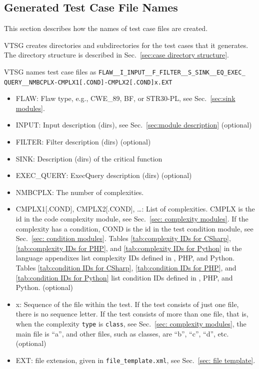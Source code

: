 \subsection{Generated Test Case File Names}

This section describes how the names of test case files are created.

VTSG creates directories and subdirectories for the test cases that it generates.
The directory structure is described in
Sec.~\ref{sec:case directory structure}.

\label{sec:case file name}

VTSG names test case files as
\verb|FLAW__I_INPUT__F_FILTER__S_SINK__EQ_EXEC_| \\
\verb|QUERY__NMBCPLX-CMPLX1[.COND]-CMPLX2[.COND]x.EXT|
\begin{itemize}[nosep]
    \item FLAW: Flaw type, e.g., CWE\_89, BF, or STR30-PL, see
	Sec.~\ref{sec:sink modules}.
    \item INPUT: Input description (dirs), see Sec.~\ref{sec:module description} (optional)
    \item FILTER:  Filter description (dirs) (optional)
    \item SINK:  Description (dirs) of the critical function
    \item EXEC\_QUERY:  ExecQuery description (dirs) (optional)

    \item NMBCPLX:  The number of complexities.
    \item CMPLX1[.COND], CMPLX2[.COND], \ldots: List of complexities.
            CMPLX is the id in the code complexity module,
            see Sec.~\ref{sec: complexity modules}.
            If the complexity has a
            condition, COND is the id in the test condition module,
            see Sec.~\ref{sec: condition modules}.
            Tables \ref{tab:complexity IDs for CSharp},
            \ref{tab:complexity IDs for PHP}, and
            \ref{tab:complexity IDs for Python} in the language appendixes list
            complexity IDs defined in \CSharp, PHP, and Python.
            Tables \ref{tab:condition IDs for CSharp},
            \ref{tab:condition IDs for PHP}, and
            \ref{tab:condition IDs for Python} list condition
            IDs defined in \CSharp, PHP, and Python. (optional)
    \item x: Sequence of the file within the test.  If the test consists of just one
      file, there is no sequence letter.  If the test consists of more than one file,
      that is, when the complexity \verb|type| is \verb|class|,
      see Sec.~\ref{sec: complexity modules},
      the main file is ``a'', and other files, such as classes, are ``b'', ``c'',
      ``d'', etc. (optional)
    \item EXT: file extension, given in \verb|file_template.xml|, see
    Sec.~\ref{sec: file template}.
\end{itemize}

